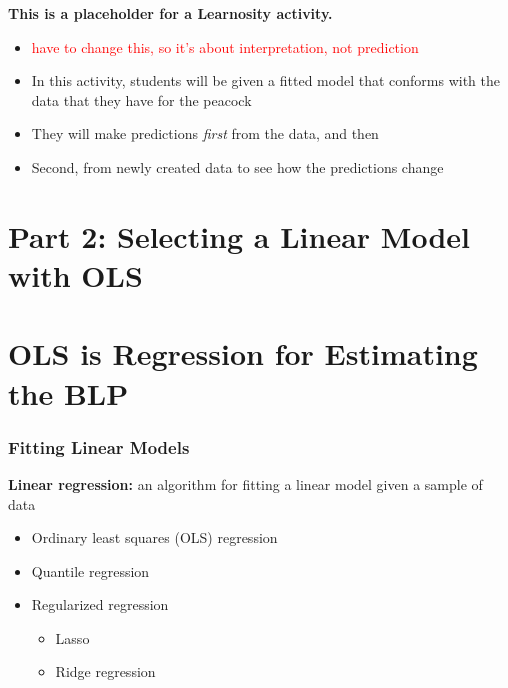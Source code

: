 \documentclass[12pt, block=fill]{beamer}
\newcommand{\paul}[1]{\textcolor{red}{#1}}
\begin{document}
\begin{frame}
  \textbf{This is a placeholder for a Learnosity activity.}

  \begin{itemize}
  \item \paul{have to change this, so it's about interpretation, not prediction}
  \item In this activity, students will be given a fitted model that
    conforms with the data that they have for the peacock
  \item They will make predictions \textit{first} from the data,
    and then
  \item Second, from newly created data to see how the predictions
    change
  \end{itemize} 
\end{frame}


\section{Part 2: Selecting a Linear Model with OLS}




\section{OLS is Regression for Estimating the BLP}

\begin{frame}
  \frametitle{Fitting Linear Models}
  
  \textbf{Linear regression:} an algorithm for fitting a linear model
  given a sample of data
  \begin{itemize}
  \item Ordinary least squares (OLS) regression
  \item Quantile regression
  \item Regularized regression
    \begin{itemize}
    \item Lasso
    \item Ridge regression
    \end{itemize} 
  \end{itemize} 
\end{frame}
\end{document}
